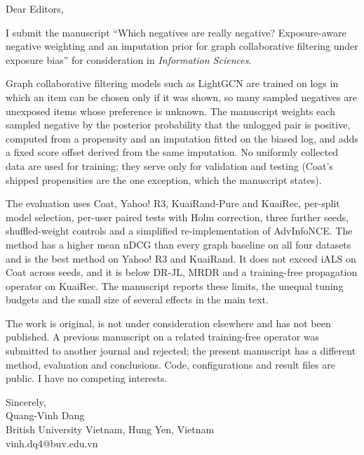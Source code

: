 \documentclass[12pt]{article}
\begin{document}
\noindent Dear Editors,\bigskip

\noindent I submit the manuscript ``Which negatives are really negative? Exposure-aware negative weighting and an imputation prior for graph collaborative filtering under exposure bias'' for consideration in \emph{Information Sciences}.

Graph collaborative filtering models such as LightGCN are trained on logs in which an item can be chosen only if it was shown, so many sampled negatives are unexposed items whose preference is unknown. The manuscript weights each sampled negative by the posterior probability that the unlogged pair is positive, computed from a propensity and an imputation fitted on the biased log, and adds a fixed score offset derived from the same imputation. No uniformly collected data are used for training; they serve only for validation and testing (Coat's shipped propensities are the one exception, which the manuscript states).

The evaluation uses Coat, Yahoo! R3, KuaiRand-Pure and KuaiRec, per-split model selection, per-user paired tests with Holm correction, three further seeds, shuffled-weight controls and a simplified re-implementation of AdvInfoNCE. The method has a higher mean nDCG than every graph baseline on all four datasets and is the best method on Yahoo! R3 and KuaiRand. It does not exceed iALS on Coat across seeds, and it is below DR-JL, MRDR and a training-free propagation operator on KuaiRec. The manuscript reports these limits, the unequal tuning budgets and the small size of several effects in the main text.

The work is original, is not under consideration elsewhere and has not been published. A previous manuscript on a related training-free operator was submitted to another journal and rejected; the present manuscript has a different method, evaluation and conclusions. Code, configurations and result files are public. I have no competing interests.\bigskip

\noindent Sincerely,\\
Quang-Vinh Dang\\
British University Vietnam, Hung Yen, Vietnam\\
vinh.dq4@buv.edu.vn
\end{document}
